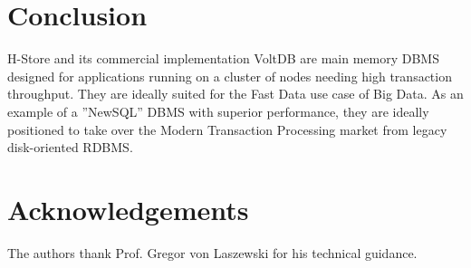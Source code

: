 \documentclass[9pt,twocolumn,twoside]{../../styles/osajnl}
\begin{document}
\section{Conclusion}
H-Store and its commercial implementation VoltDB are main memory DBMS designed 
for applications running on a cluster of nodes needing high transaction 
throughput. They are ideally suited for the Fast Data use case of Big Data. As 
an example of a ”NewSQL” DBMS with superior performance, they are ideally positioned to take over  
the Modern Transaction Processing market from legacy disk-oriented RDBMS.

\section*{Acknowledgements}

The authors thank Prof. Gregor von Laszewski for his technical guidance.


\end{document}
